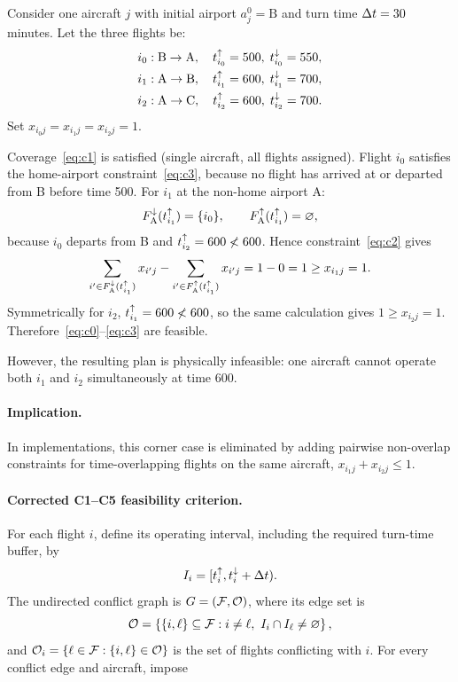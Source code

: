 \begin{example}
  \label{ex:simultaneous_departure_counterexample}
  Consider one aircraft $j$ with initial airport $a^0_j=\text{B}$ and
  turn time $\Delta t=30$ minutes. Let the three flights be:
  \begin{align*}
    &i_0: \text{B}\to\text{A},\quad t^{\uparrow}_{i_0}=500,\;t^{\downarrow}_{i_0}=550,\\
    &i_1: \text{A}\to\text{B},\quad t^{\uparrow}_{i_1}=600,\;t^{\downarrow}_{i_1}=700,\\
    &i_2: \text{A}\to\text{C},\quad t^{\uparrow}_{i_2}=600,\;t^{\downarrow}_{i_2}=700.
  \end{align*}
  Set $x_{i_0j}=x_{i_1j}=x_{i_2j}=1$.

  Coverage~\eqref{eq:c1} is satisfied (single aircraft, all flights assigned).
  Flight $i_0$ satisfies the home-airport constraint~\eqref{eq:c3}, because
  no flight has arrived at or departed from B before time 500. For $i_1$ at
  the non-home airport A:
  \begin{equation*}
    F^{\downarrow}_{\text{A}}(t^{\uparrow}_{i_1})=\{i_0\},\qquad
    F^{\uparrow}_{\text{A}}(t^{\uparrow}_{i_1})=\varnothing,
  \end{equation*}
  because $i_0$ departs from B and $t^{\uparrow}_{i_2}=600\not<600$. Hence
  constraint~\eqref{eq:c2} gives
  \begin{equation*}
    \sum_{i'\in F^{\downarrow}_{\text{A}}(t^{\uparrow}_{i_1})}x_{i'j}
    -\sum_{i'\in F^{\uparrow}_{\text{A}}(t^{\uparrow}_{i_1})}x_{i'j}
    =1-0=1
    \ge x_{i_1j}=1.
  \end{equation*}
  Symmetrically for $i_2$, $t^{\uparrow}_{i_1}=600\not<600$, so the same calculation gives
  $1\ge x_{i_2j}=1$. Therefore~\eqref{eq:c0}--\eqref{eq:c3} are feasible.

  However, the resulting plan is physically infeasible: one aircraft cannot
  operate both $i_1$ and $i_2$ simultaneously at time 600.
\end{example}

\paragraph{Implication.}
In implementations, this corner case is eliminated by adding pairwise
non-overlap constraints for time-overlapping flights on the same aircraft,
$x_{i_1j}+x_{i_2j}\le 1$.

\paragraph{Corrected C1--C5 feasibility criterion.}
For each flight $i$, define its operating interval, including the required
turn-time buffer, by
\begin{equation}
  I_i=[t^{\uparrow}_{i},t^{\downarrow}_{i}+\Delta t).
\end{equation}
The undirected conflict graph is $G=(\mathcal{F},\mathcal{O})$, where its edge set is
\begin{equation}
  \mathcal{O}=\left\{\{i,\ell\}\subseteq\mathcal{F}:
  i\neq\ell,\ I_i\cap I_\ell\neq\varnothing\right\},
  \label{eq:overlap_set}
\end{equation}
and $\mathcal{O}_i=\{\ell\in\mathcal{F}:\{i,\ell\}\in\mathcal{O}\}$ is the set of
flights conflicting with $i$. For every conflict edge and aircraft, impose


